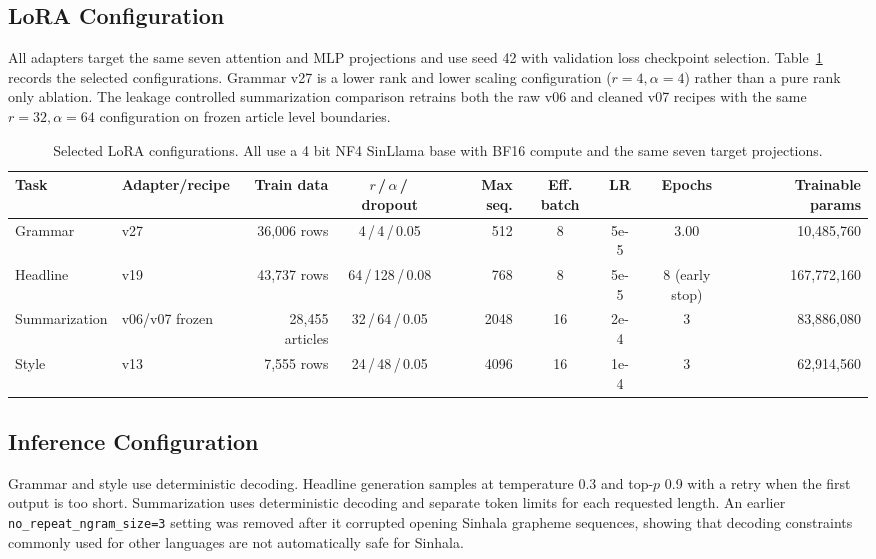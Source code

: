 \documentclass[a4paper,conference]{IEEEtran}
\begin{document}
\subsection{LoRA Configuration}
All adapters target the same seven attention and MLP projections and use seed
42 with validation loss checkpoint selection. Table~\ref{tab:config} records
the selected configurations. Grammar v27 is a lower rank and lower scaling
configuration ($r=4,\alpha=4$) rather than a pure rank only ablation. The
leakage controlled summarization comparison retrains both the raw v06 and
cleaned v07 recipes with the same $r=32,\alpha=64$ configuration on frozen
article level boundaries.

\begin{table}[!t]
\caption{Selected LoRA configurations. All use a 4 bit NF4 SinLlama base with BF16 compute and the same seven target projections.}
\label{tab:config}
\centering
\footnotesize
\setlength{\tabcolsep}{4pt}
\renewcommand{\arraystretch}{1.08}
\begin{tabular}{|l|l|r|c|r|c|c|c|r|}
\hline
\textbf{Task} & \textbf{Adapter/recipe} & \textbf{Train data} & \textbf{$r$\,/\,$\alpha$\,/\,dropout} &
\textbf{Max seq.} & \textbf{Eff. batch} & \textbf{LR} & \textbf{Epochs} & \textbf{Trainable params} \\
\hline
Grammar       & v27 & 36,006 rows & 4\,/\,4\,/\,0.05    & 512  & 8  & 5e-5 & 3.00  & 10,485,760 \\
\hline
Headline      & v19 & 43,737 rows & 64\,/\,128\,/\,0.08 & 768  & 8  & 5e-5 & 8 (early stop) & 167,772,160 \\
\hline
Summarization & v06/v07 frozen & 28,455 articles & 32\,/\,64\,/\,0.05  & 2048 & 16 & 2e-4 & 3 & 83,886,080 \\
\hline
Style         & v13 & 7,555 rows  & 24\,/\,48\,/\,0.05  & 4096 & 16 & 1e-4 & 3 & 62,914,560 \\
\hline
\end{tabular}
\end{table}

\subsection{Inference Configuration}
Grammar and style use deterministic decoding. Headline generation samples at
temperature 0.3 and top-$p$ 0.9 with a retry when the first output is too short. Summarization uses
deterministic decoding and separate token limits for each requested length. An earlier
\texttt{no\_repeat\_ngram\_size=3} setting was removed after it corrupted
opening Sinhala grapheme sequences, showing that decoding constraints commonly
used for other languages are not automatically safe for Sinhala.
\end{document}

